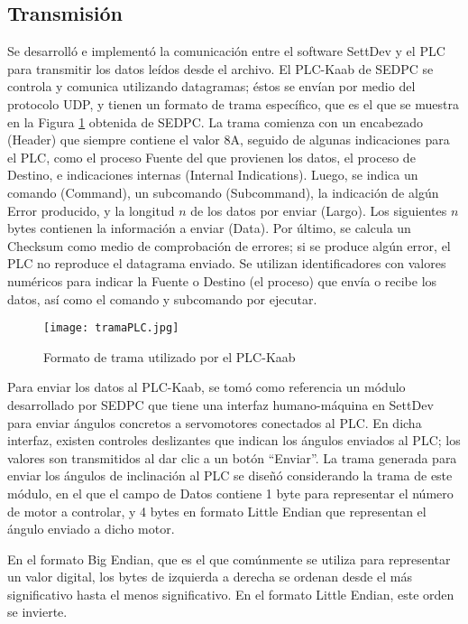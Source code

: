 \subsection{Transmisión}

Se desarrolló e implementó la comunicación entre el software SettDev y el PLC para transmitir los datos leídos desde el archivo. El PLC-Kaab de SEDPC se controla y comunica utilizando datagramas; éstos se envían por medio del protocolo UDP, y tienen un formato de trama específico, que es el que se muestra en la Figura \ref{fig:tramaPLC} obtenida de SEDPC. La trama comienza con un encabezado (Header) que siempre contiene el valor 8A, seguido de algunas indicaciones para el PLC, como el proceso Fuente del que provienen los datos, el proceso de Destino, e indicaciones internas (Internal Indications). Luego, se indica un comando (Command), un subcomando (Subcommand), la indicación de algún Error producido, y la longitud $n$ de los datos por enviar (Largo). Los siguientes $n$ bytes contienen la información a enviar (Data). Por último, se calcula un Checksum como medio de comprobación de errores; si se produce algún error, el PLC no reproduce el datagrama enviado. Se utilizan identificadores con valores numéricos para indicar la Fuente o Destino (el proceso) que envía o recibe los datos, así como el comando y subcomando por ejecutar.

\begin{figure}[htb]
	\centering
	\texttt{[image: tramaPLC.jpg]}
	\caption{Formato de trama utilizado por el PLC-Kaab}
	\label{fig:tramaPLC}
\end{figure}

Para enviar los datos al PLC-Kaab, se tomó como referencia  un módulo desarrollado por SEDPC que tiene una interfaz humano-máquina en SettDev para enviar ángulos concretos a servomotores conectados al PLC. En dicha interfaz, existen controles deslizantes que indican los ángulos enviados al PLC; los valores son transmitidos al dar clic a un botón ``Enviar''. La trama generada para enviar los ángulos de inclinación al PLC se diseñó considerando la trama de este módulo, en el que el campo de Datos contiene 1 byte para representar el número de motor a controlar, y 4 bytes en formato Little Endian que representan el ángulo enviado a dicho motor.

En el formato Big Endian, que es el que comúnmente se utiliza para representar un valor digital, los bytes de izquierda a derecha se ordenan desde el más significativo hasta el menos significativo. En el formato Little Endian, este orden se invierte.